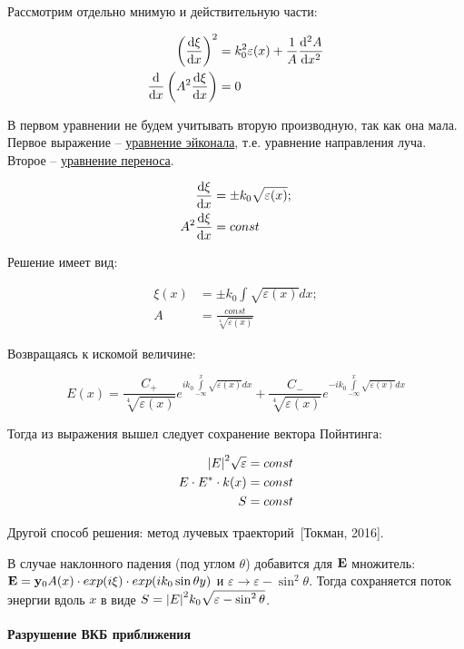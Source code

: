 \documentclass[10pt, a4paper]{article}
\newcommand{\Tokman}{~[Токман, 2016]}
\begin{document}
Рассмотрим отдельно мнимую и действительную части:

\begin{align*}
	\left(\dv{\xi}{x}\right)^2 &= k_0^2\varepsilon(x) + \frac{1}{A} \dv[2]{A}{x} \\
	\dv{}{x}\left(A^2\dv{\xi}{x}\right) &= 0 
\end{align*}

В первом уравнении не будем учитывать вторую производную, так как она мала. Первое выражение -- \uline{уравнение эйконала}, т.е. уравнение направления луча. Второе -- \uline{уравнение переноса}.

\begin{align*}
	\dv{\xi}{x} &= \pm k_0\sqrt{\varepsilon(x)}; \\
	A^2 \dv{\xi}{x} &= const
\end{align*}

Решение имеет вид:

\begin{align*}
	\xi(x) &= \pm k_0 \int\sqrt{\varepsilon(x)} dx; \\
	A &= \frac{const}{\sqrt[4]{\varepsilon(x)}}
\end{align*}

Возвращаясь к искомой величине:

\begin{equation*}
	E(x) = \frac{C_+}{\sqrt[4]{\varepsilon(x)}} e^{ik_0 \int\limits_{-\infty}^x\sqrt{\varepsilon(x)} dx} +\frac{C_-}{\sqrt[4]{\varepsilon(x)}} e^{-ik_0 \int\limits_{-\infty}^x\sqrt{\varepsilon(x)} dx}
\end{equation*}

Тогда из выражения вышел следует сохранение вектора Пойнтинга:

\begin{align*}
	\abs{E}^2\sqrt{\varepsilon} &= const \\
	E\cdot E^{*} \cdot k(x) &= const \\
	S &= const
\end{align*}

Другой способ решения: метод лучевых траекторий\Tokman.

В случае наклонного падения (под углом $\theta$) добавится для $\vb{E}$ множитель: $\vb{E} = \vb{y}_0A(x)\cdot exp(i\xi)\cdot exp(ik_0\sin\theta y)$ и $\varepsilon\rightarrow\varepsilon - \sin^2\theta$. Тогда сохраняется поток энергии вдоль $x$ в виде $S = \abs{E}^2k_0\sqrt{\varepsilon-\sin^2\theta}$.

\paragraph{Разрушение ВКБ приближения}
\end{document}
